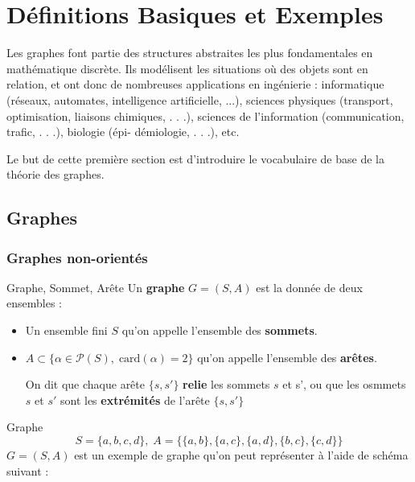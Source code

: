 \chapter{Définitions Basiques et Exemples}

Les graphes font partie des structures abstraites les plus fondamentales en mathématique discrète. Ils modélisent les situations où des objets sont en relation, et ont donc de nombreuses applications en ingénierie : informatique (réseaux, automates, intelligence artificielle, ...), sciences physiques (transport, optimisation, liaisons chimiques, . . .), sciences de l’information (communication, trafic, . . .), biologie (épi- démiologie, . . .), etc.

Le but de cette première section est d’introduire le vocabulaire de base de la théorie des graphes.
\section{Graphes}

\subsection{Graphes non-orientés} %
\label{sub:Graphes non-orientés}

\begin{Definition}[colbacktitle=red!75!black]{Graphe, Sommet, Arête}{}
Un \textbf{graphe} $G = (S,A)$ est la donnée de deux ensembles :
\begin{itemize}
    \item Un ensemble fini $S$ qu'on appelle l'ensemble des \textbf{sommets}.
    \item $A \subset  \{ \alpha \in \mathcal{P} (S),\; \mathrm{card} (\alpha)=2 \}$ qu'on appelle l'ensemble des \textbf{arêtes}.

        On dit que chaque arête $\{s, s'\}$  \textbf{relie} les sommets $s$ et s', ou que les osmmets $s$ et $s'$ sont les  \textbf{extrémités} de l'arête $\{s, s'\}$
\end{itemize}
\end{Definition}
\begin{Example}{Graphe}{}
\[
    S = \{a,b,c,d\},\; A = \{\{a,b\}, \{a,c\}, \{a,d\},\{b,c\}, \{c,d\}\}
\]
$G = (S,A)$ est un exemple de graphe qu'on peut représenter à l'aide de schéma suivant : 

\begin{center}
\end{center}
\end{Example}

